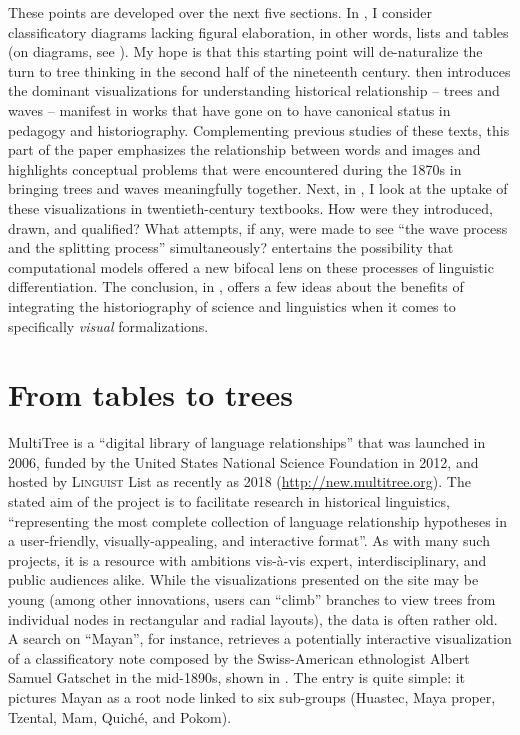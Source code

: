 \documentclass[output=paper]{langscibook}
\begin{document}
These points are developed over the next five sections. In , I consider classificatory diagrams lacking figural elaboration, in other words, lists and tables (on diagrams, see \citealt{Bigg2016}). My hope is that this starting point will de-naturalize the turn to tree thinking in the second half of the nineteenth century.  then introduces the dominant visualizations for understanding historical relationship -- trees and waves -- manifest in works that have gone on to have canonical status in pedagogy and historiography. Complementing previous studies of these texts, this part of the paper emphasizes the relationship between words and images and highlights conceptual problems that were encountered during the 1870s in bringing trees and waves meaningfully together. Next, in , I look at the uptake of these visualizations in twentieth-century textbooks. How were they introduced, drawn, and qualified? What attempts, if any, were made to see ``the wave process and the splitting process'' simultaneously?  entertains the possibility that computational models offered a new bifocal lens on these processes of linguistic differentiation. The conclusion, in , offers a few ideas about the benefits of integrating the historiography of science and linguistics when it comes to specifically \emph{visual} formalizations.

\section{From tables to trees}
\label{sec:kaplan:tablestrees}

MultiTree is a ``digital library of language relationships'' that was launched in 2006, funded by the United States National Science Foundation in 2012, and hosted by \textsc{Linguist} List as recently as 2018 (\url{http://new.multitree.org}). The stated aim of the project is to facilitate research in historical linguistics, ``representing the most complete collection of language relationship hypotheses in a user-friendly, visually-appealing, and interactive format''. As with many such projects, it is a resource with ambitions vis-à-vis expert, interdisciplinary, and public audiences alike. While the visualizations presented on the site may be young (among other innovations, users can ``climb'' branches to view trees from individual nodes in rectangular and radial layouts), the data is often rather old. A search on ``Ma\-yan'', for instance, retrieves a potentially interactive visualization of a classificatory note composed by the Swiss-American ethnologist Albert Samuel Gatschet in the mid-1890s, shown in . The entry is quite simple: it pictures Mayan as a root node linked to six sub-groups (Huastec, Maya proper, Tzental, Mam, Quiché, and Pokom).
\end{document}
